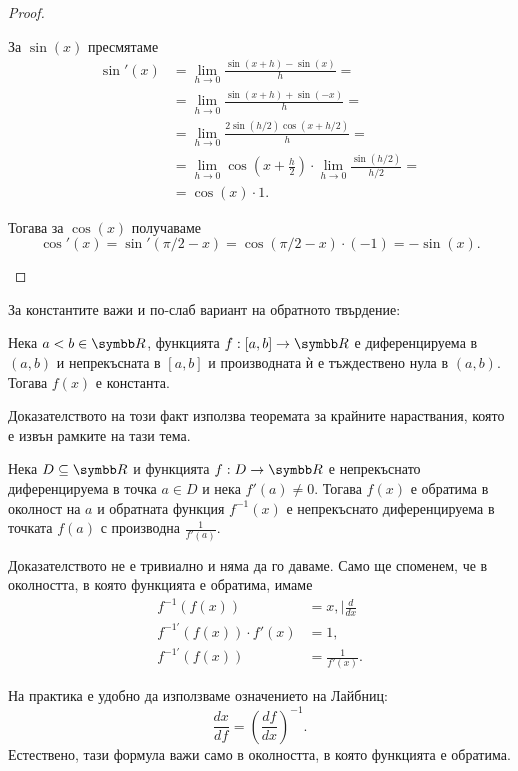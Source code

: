 \documentclass[numbers=endperiod, bibliography=totocnumbered]{scrartcl}
\begin{document}
\begin{proof}
\begin{enumerate}
    За \( \sin(x) \) пресмятаме
    \begin{align*}
      \sin'(x)
      &=
      \lim_{h \to 0} \frac {\sin(x+h) - \sin(x)} h
      = \\ &=
      \lim_{h \to 0} \frac {\sin(x+h) + \sin(-x)} h
      = \\ &=
      \lim_{h \to 0} \frac {2 \sin(h / 2) \cos(x+h/2)} h
      = \\ &=
      \lim_{h \to 0} \cos \left(x + \frac h 2 \right) \cdot \lim_{h \to 0} \frac {\sin(h / 2)} {h/2}
      = \\ &=
      \cos(x) \cdot 1.
    \end{align*}

    Тогава за \( \cos(x) \) получаваме
    \begin{equation*}
      \cos'(x) = \sin'(\pi / 2 - x) = \cos(\pi / 2 - x) \cdot (-1) = -\sin(x).
    \end{equation*}
  \end{enumerate}
\end{proof}

За константите важи и по-слаб вариант на обратното твърдение:
\begin{proposition}\label{thm:zero_derivative}
  Нека \( a < b \in \R \), функцията \( f: [a, b] \to \R \) е диференцируема в \( (a, b) \) и непрекъсната в \( [a, b] \) и производната ѝ е тъждествено нула в \( (a, b) \). Тогава \( f(x) \) е константа.
\end{proposition}
\begin{remark}
  Доказателството на този факт използва теоремата за крайните нараствания, която е извън рамките на тази тема.
\end{remark}

\begin{theorem}
  Нека \( D \subseteq \R \) и функцията \( f: D \to \R \) е непрекъснато диференцируема в точка \( a \in D \) и нека \( f'(a) \neq 0 \). Тогава \( f(x) \) е обратима в околност на \( a \) и обратната функция \( f^{-1} (x) \) е непрекъснато диференцируема в точката \( f(a) \) с производна \( \frac 1 {f'(a)} \).
\end{theorem}
\begin{remark}
  Доказателството не е тривиално и няма да го даваме. Само ще споменем, че в околността, в която функцията е обратима, имаме
  \begin{align*}
    f^{-1}(f(x)) &= x, \mid \frac d {dx}
    \\
    f^{-1'}(f(x)) \cdot f'(x) &= 1,
    \\
    f^{-1'}(f(x)) &= \frac 1 {f'(x)}.
  \end{align*}

  На практика е удобно да използваме означението на Лайбниц:
  \begin{equation*}
    \frac {dx} {df} = {\left( \frac {df} {dx} \right)}^{-1}.
  \end{equation*}
  Естествено, тази формула важи само в околността, в която функцията е обратима.
\end{remark}
\end{document}
